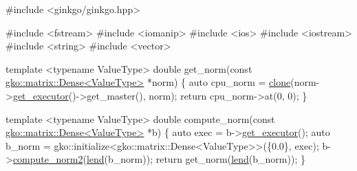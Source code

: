 \begin{DoxyCodeInclude}
\textcolor{preprocessor}{#include <ginkgo/ginkgo.hpp>}

\textcolor{preprocessor}{#include <fstream>}
\textcolor{preprocessor}{#include <iomanip>}
\textcolor{preprocessor}{#include <ios>}
\textcolor{preprocessor}{#include <iostream>}
\textcolor{preprocessor}{#include <string>}
\textcolor{preprocessor}{#include <vector>}

\textcolor{keyword}{template} <\textcolor{keyword}{typename} ValueType>
\textcolor{keywordtype}{double} get\_norm(\textcolor{keyword}{const} \hyperlink{classgko_1_1matrix_1_1Dense}{gko::matrix::Dense<ValueType>} *norm)
\{
    \textcolor{keyword}{auto} cpu\_norm = \hyperlink{namespacegko_a1beb80750459e4201aa9d882d2d074c3}{clone}(norm->\hyperlink{classgko_1_1PolymorphicObject_ab40586bff071b7f11c2cf6b5cbf598eb}{get\_executor}()->get\_master(), norm);
    \textcolor{keywordflow}{return} cpu\_norm->at(0, 0);
\}

\textcolor{keyword}{template} <\textcolor{keyword}{typename} ValueType>
\textcolor{keywordtype}{double} compute\_norm(\textcolor{keyword}{const} \hyperlink{classgko_1_1matrix_1_1Dense}{gko::matrix::Dense<ValueType>} *b)
\{
    \textcolor{keyword}{auto} exec = b->\hyperlink{classgko_1_1PolymorphicObject_ab40586bff071b7f11c2cf6b5cbf598eb}{get\_executor}();
    \textcolor{keyword}{auto} b\_norm = gko::initialize<gko::matrix::Dense<ValueType>>(\{0.0\}, exec);
    b->\hyperlink{classgko_1_1matrix_1_1Dense_a97fd354c4a26814586cd256b5f0d7bea}{compute\_norm2}(\hyperlink{namespacegko_aa8cb4876b72e5e1036ea9575443c439b}{lend}(b\_norm));
    \textcolor{keywordflow}{return} get\_norm(\hyperlink{namespacegko_aa8cb4876b72e5e1036ea9575443c439b}{lend}(b\_norm));
\}


\end{DoxyCodeInclude}
